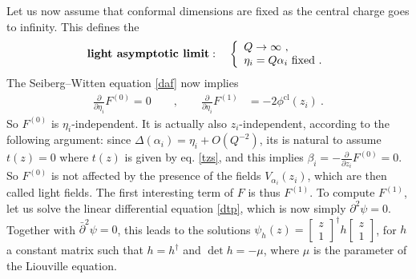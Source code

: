 \documentclass[12pt, a4paper, notitlepage, twoside]{report}
\numberwithin{equation}{section}
\theoremstyle{break}
\begin{document}
Let us now assume that conformal dimensions are fixed as the central charge goes to infinity.
This defines the 
\begin{align}
 \textbf{\boldmath light\ asymptotic\ limit}\index{light\ asymptotic\ limit}: \quad \left\{\begin{array}{l}  Q \to \infty \ ,\\ \eta_i=Q\alpha_i\ \text{fixed}\ .\end{array}\right.  
\end{align}
 The Seiberg--Witten equation \eqref{daf} now implies 
\begin{align}
 {\frac{\partial}{\partial \eta_i}} F^{(0)}  = 0 \qquad ,\qquad 
{\frac{\partial}{\partial \eta_i}} F^{(1)} & = -2\phi^\text{cl}(z_i) \ .
\label{pefo}
\end{align}
So $F^{(0)}$ is $\eta_i$-independent.
It is actually also $z_i$-independent, according to the following argument: since $\Delta(\alpha_i)=\eta_i + O(Q^{-2})$, its is natural to assume $t(z)=0$ where $t(z)$ is given by eq. \eqref{tzs}, and this implies $\beta_i=-{\frac{\partial}{\partial z_i}} F^{(0)}=0$.
So $F^{(0)}$ is not affected by the presence of the fields $V_{\alpha_i}(z_i)$, which are then called light fields.
The first interesting term of $F$ is thus $F^{(1)}$.
To compute $F^{(1)}$, let us solve the linear differential equation \eqref{dtp}, which is now simply $\partial^2 \psi=0$.
Together with $\bar\partial^2\psi=0$, this leads to the solutions 
$\psi_h(z) = \left[\begin{smallmatrix} z \\ 1 \end{smallmatrix}\right]^\dagger h \left[\begin{smallmatrix} z \\ 1 \end{smallmatrix}\right]$, for $h$ a constant matrix such that $h=h^\dagger$ and $\det h = -\mu$, where $\mu$ is the parameter of the Liouville equation.
\end{document}
